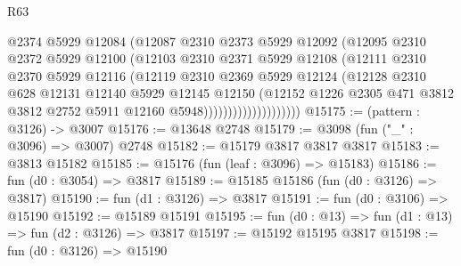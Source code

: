 \begin{lexlean}{R63}
\begin{coremodule}
                              @2374
                              @5929
                              @12084
                              (@12087
                                @2310
                                @2373
                                @5929
                                @12092
                                (@12095
                                  @2310
                                  @2372
                                  @5929
                                  @12100
                                  (@12103
                                    @2310
                                    @2371
                                    @5929
                                    @12108
                                    (@12111
                                      @2310
                                      @2370
                                      @5929
                                      @12116
                                      (@12119
                                        @2310
                                        @2369
                                        @5929
                                        @12124
                                        (@12128
                                          @2310
                                          @628
                                          @12131
                                          @12140
                                          @5929
                                          @12145
                                          @12150
                                          (@12152
                                            @1226
                                            @2305
                                            @471
                                            @3812
                                            @3812
                                            @2752
                                            @5911
                                            @12160
                                            @5948))))))))))))))))))))
@15175 := (pattern : @3126) -> @3007
@15176 := @13648 @2748
@15179 := @3098 (fun ("_" : @3096) => @3007) @2748
@15182 := @15179 @3817 @3817 @3817
@15183 := @3813 @15182
@15185 := @15176 (fun (leaf : @3096) => @15183)
@15186 := fun (d0 : @3054) => @3817
@15189 := @15185 @15186 (fun (d0 : @3126) => @3817)
@15190 := fun (d1 : @3126) => @3817
@15191 := fun (d0 : @3106) => @15190
@15192 := @15189 @15191
@15195 := fun (d0 : @13) => fun (d1 : @13) => fun (d2 : @3126) => @3817
@15197 := @15192 @15195 @3817
@15198 := fun (d0 : @3126) => @15190

\end{coremodule}
\end{lexlean}
